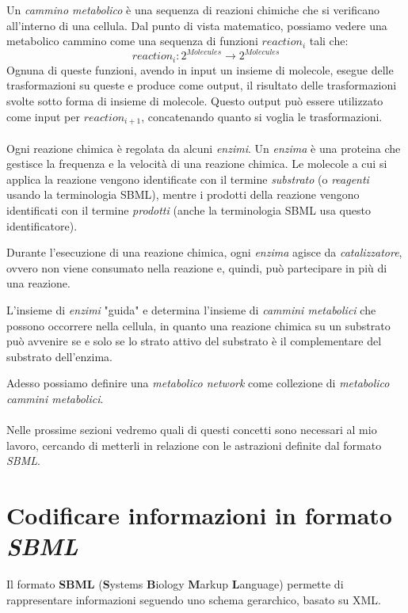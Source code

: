 Un \emph{cammino metabolico} \`e una sequenza di reazioni chimiche che
si verificano all'interno di una cellula. Dal punto di vista
matematico, possiamo vedere una metabolico cammino come una sequenza di
funzioni $reaction_{i}$ tali che:
\begin{displaymath}
reaction_{i} : 2^{Molecules} \rightarrow 2^{Molecules}
\end{displaymath}
Ognuna di queste funzioni, avendo in input un insieme di molecole,
esegue delle trasformazioni su queste e produce come output, il
risultato delle trasformazioni svolte sotto forma di insieme di
molecole. Questo output pu\`o essere utilizzato come input per
$reaction_{i+1}$, concatenando quanto si voglia le trasformazioni.
\\\\
Ogni reazione chimica \`e regolata da alcuni \emph{enzimi}. Un
\emph{enzima} \`e una proteina che gestisce la frequenza e la
velocit\`a di una reazione chimica. Le molecole a cui si applica la
reazione vengono identificate con il termine \emph{substrato} (o
\emph{reagenti} usando la terminologia SBML), mentre i prodotti della
reazione vengono identificati con il termine \emph{prodotti} (anche
la terminologia SBML usa questo identificatore).

Durante l'esecuzione di una reazione chimica, ogni \emph{enzima}
agisce da \emph{catalizzatore}, ovvero non viene consumato nella reazione
e, quindi, pu\`o partecipare in pi\`u di una reazione.

L'insieme di \emph{enzimi} "guida" e determina l'insieme di
\emph{cammini metabolici} che possono occorrere nella cellula, in
quanto una reazione chimica su un substrato pu\`o avvenire se e solo
se lo strato attivo del substrato \`e il complementare del substrato
dell'enzima.

Adesso possiamo definire una \emph{metabolico network} come collezione
di \emph{metabolico cammini metabolici}.
\\\\
Nelle prossime sezioni vedremo quali di questi concetti sono necessari
al mio lavoro, cercando di metterli in relazione con le astrazioni
definite dal formato \emph{SBML}.

\section{Codificare informazioni in formato \emph{SBML}}
Il formato \textbf{SBML} (\textbf{S}ystems \textbf{B}iology
\textbf{M}arkup \textbf{L}anguage) permette di rappresentare
informazioni seguendo uno schema gerarchico, basato su XML.

